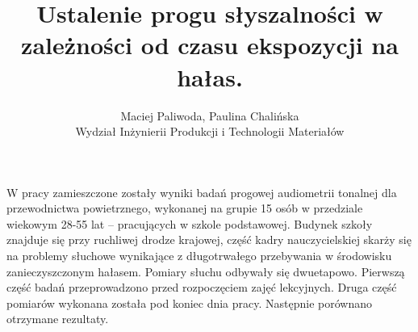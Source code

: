 \documentclass[12pt, a4paper]{article}
\begin{document}
\title{Ustalenie progu słyszalności w zależności od czasu ekspozycji na hałas.}
\author{Maciej Paliwoda, Paulina Chalińska \\ Wydział Inżynierii Produkcji i Technologii Materiałów}
\date {}
\maketitle
\thispagestyle{title}
W pracy zamieszczone zostały wyniki badań progowej audiometrii tonalnej dla przewodnictwa powietrznego, wykonanej na grupie 15 osób w przedziale wiekowym 28-55 lat – pracujących w szkole podstawowej. Budynek szkoły znajduje się przy ruchliwej drodze krajowej, część kadry nauczycielskiej skarży się na problemy słuchowe wynikające z długotrwałego przebywania w środowisku zanieczyszczonym hałasem. Pomiary słuchu odbywały się dwuetapowo. Pierwszą część badań przeprowadzono przed rozpoczęciem zajęć lekcyjnych. Druga część pomiarów wykonana została pod koniec dnia pracy. Następnie porównano otrzymane rezultaty.
\end{document}
